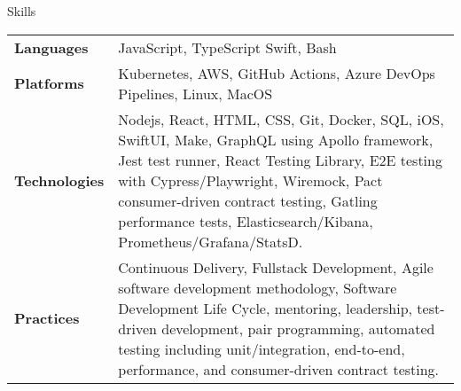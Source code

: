 \begin{section}{Skills}
  \begin{tabularx}{\linewidth}{@{}l X@{}}
    \textbf{Languages} &\small{JavaScript, TypeScript Swift, Bash} \\
    \textbf{Platforms} &\small{Kubernetes, AWS, GitHub Actions, Azure DevOps Pipelines, Linux, MacOS} \\
    \textbf{Technologies} &\small{Nodejs, React, HTML, CSS, Git, Docker, SQL, iOS, SwiftUI, Make, GraphQL using Apollo framework,  Jest test runner, React Testing Library, E2E testing with Cypress/Playwright, Wiremock, Pact consumer-driven contract testing, Gatling performance tests, Elasticsearch/Kibana, Prometheus/Grafana/StatsD.} \\
    \textbf{Practices} &\small{Continuous Delivery, Fullstack Development, Agile software development methodology, Software Development Life Cycle, mentoring, leadership, test-driven development, pair programming, automated testing including unit/integration, end-to-end, performance, and consumer-driven contract testing.} \\
  \end{tabularx}
\end{section}
